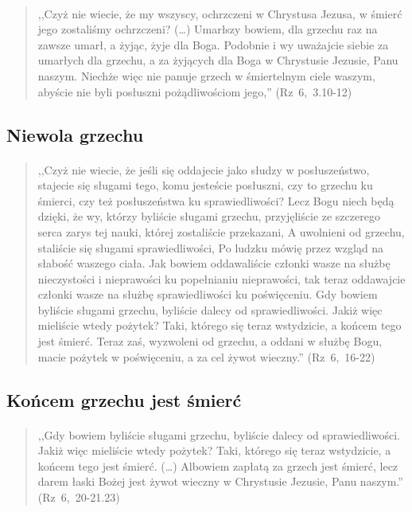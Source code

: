 \documentclass[10pt,a4paper,oneside]{article}
\begin{document}
\paragraph{}
\begin{quote}
,,Czyż nie wiecie, że my wszyscy, ochrzczeni w Chrystusa Jezusa, w śmierć jego zostaliśmy ochrzczeni? (\ldots) Umarłszy bowiem, dla grzechu raz na zawsze umarł, a żyjąc, żyje dla Boga. Podobnie i wy uważajcie siebie za umarłych dla grzechu, a za żyjących dla Boga w Chrystusie Jezusie, Panu naszym. Niechże więc nie panuje grzech w śmiertelnym ciele waszym, abyście nie byli posłuszni pożądliwościom jego,'' \mbox{(Rz 6, 3.10-12)}
\end{quote}
\subsection{Niewola grzechu}
\paragraph{}
\begin{quote}
,,Czyż nie wiecie, że jeśli się oddajecie jako słudzy w posłuszeństwo, stajecie się sługami tego, komu jesteście posłuszni, czy to grzechu ku śmierci, czy też posłuszeństwa ku sprawiedliwości? Lecz Bogu niech będą dzięki, że wy, którzy byliście sługami grzechu, przyjęliście ze szczerego serca zarys tej nauki, której zostaliście przekazani, A uwolnieni od grzechu, staliście się sługami sprawiedliwości, Po ludzku mówię przez wzgląd na słabość waszego ciała. Jak bowiem oddawaliście członki wasze na służbę nieczystości i nieprawości ku popełnianiu nieprawości, tak teraz oddawajcie członki wasze na służbę sprawiedliwości ku poświęceniu. Gdy bowiem byliście sługami grzechu, byliście dalecy od sprawiedliwości. Jakiż więc mieliście wtedy pożytek? Taki, którego się teraz wstydzicie, a końcem tego jest śmierć. Teraz zaś, wyzwoleni od grzechu, a oddani w służbę Bogu, macie pożytek w poświęceniu, a za cel żywot wieczny.'' \mbox{(Rz 6, 16-22)}
\end{quote}
\subsection{Końcem grzechu jest śmierć}
\paragraph{}
\begin{quote}
,,Gdy bowiem byliście sługami grzechu, byliście dalecy od sprawiedliwości. Jakiż więc mieliście wtedy pożytek? Taki, którego się teraz wstydzicie, a końcem tego jest śmierć. (\ldots) Albowiem zapłatą za grzech jest śmierć, lecz darem łaski Bożej jest żywot wieczny w Chrystusie Jezusie, Panu naszym.'' \mbox{(Rz 6, 20-21.23)}
\end{quote}
\end{document}
